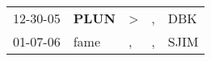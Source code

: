 \begin{supertabular}{p{0.07\textwidth}p{0.06\textwidth}p{0.02\textwidth}p{0.02\textwidth}p{0.06\textwidth}}
 12-30-05\textsuperscript{} &  \textbf{PLUN\textsuperscript{}} &  \textgreater &  , &   DBK\textsuperscript{} \\
 01-07-06\textsuperscript{} &           fame\textsuperscript{} &             , &  , &  SJIM\textsuperscript{} \\
\end{supertabular}
